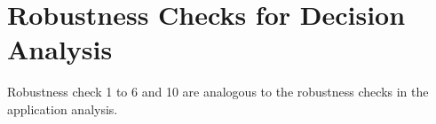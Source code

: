 \documentclass[11pt,a4paper]{scrartcl}
\begin{document}
\clearpage
\FloatBarrier



\clearpage
\FloatBarrier


\clearpage
\FloatBarrier






\clearpage
\FloatBarrier
\section{Robustness Checks for Decision Analysis}
Robustness check 1 to 6 and 10 are analogous to the robustness checks in the application analysis.
\end{document}
